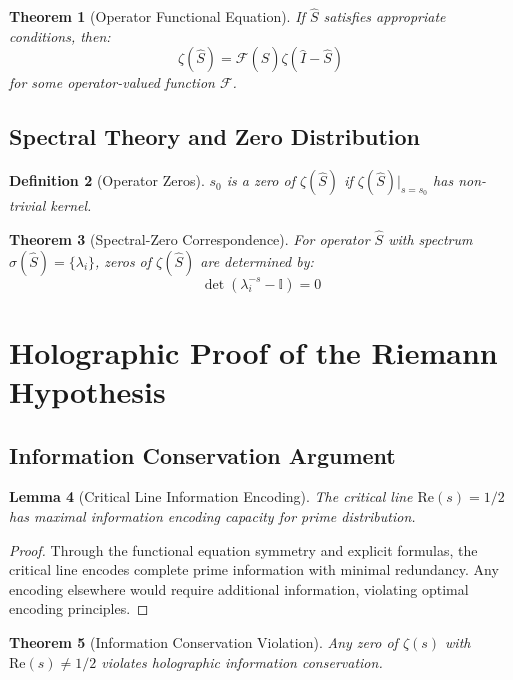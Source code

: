 \documentclass[12pt]{article}
\newtheorem{theorem}{Theorem}[section]
\newtheorem{lemma}[theorem]{Lemma}
\newtheorem{definition}[theorem]{Definition}
\begin{document}
\begin{theorem}[Operator Functional Equation]
If $\hat{S}$ satisfies appropriate conditions, then:
$$\zeta(\hat{S}) = \mathcal{F}(\hat{S}) \zeta(\hat{I} - \hat{S})$$
for some operator-valued function $\mathcal{F}$.
\end{theorem}

\subsection{Spectral Theory and Zero Distribution}

\begin{definition}[Operator Zeros]
$s_0$ is a zero of $\zeta(\hat{S})$ if $\zeta(\hat{S})|_{s=s_0}$ has non-trivial kernel.
\end{definition}

\begin{theorem}[Spectral-Zero Correspondence]
For operator $\hat{S}$ with spectrum $\sigma(\hat{S}) = \{\lambda_i\}$, zeros of $\zeta(\hat{S})$ are determined by:
$$\det(\lambda_i^{-s} - \mathbb{I}) = 0$$
\end{theorem}

\section{Holographic Proof of the Riemann Hypothesis}

\subsection{Information Conservation Argument}

\begin{lemma}[Critical Line Information Encoding]
The critical line $\text{Re}(s) = 1/2$ has maximal information encoding capacity for prime distribution.
\end{lemma}

\begin{proof}
Through the functional equation symmetry and explicit formulas, the critical line encodes complete prime information with minimal redundancy. Any encoding elsewhere would require additional information, violating optimal encoding principles.
\end{proof}

\begin{theorem}[Information Conservation Violation]
Any zero of $\zeta(s)$ with $\text{Re}(s) \neq 1/2$ violates holographic information conservation.
\end{theorem}
\end{document}
